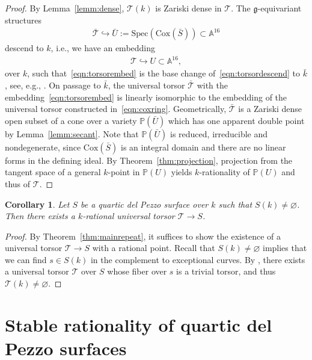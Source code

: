 \documentclass[12pt, reqno]{amsart}
\theoremstyle{plain}
\newtheorem{coro}[prop]{Corollary}
\theoremstyle{remark}
\theoremstyle{definition}
\numberwithin{equation}{section}
\def\cT{{\mathcal T}}
\def\bA{{\mathbb A}}
\def\bP{{\mathbb P}}
\def\Cox{\mathrm{Cox}}
\def\Spec{\mathrm{Spec}}
\begin{document}
\begin{proof}
By Lemma~\ref{lemm:dense}, $\cT(k)$ is Zariski dense in $\cT$.
The $\mathfrak g$-equivariant structures
\begin{align}\label{eqn:torsorembed}
    \bar{\cT}\hookrightarrow \bar{U}:=\Spec(\Cox(\bar{S}))\subset \bA^{16}
\end{align}
descend to $k$, i.e., we have 
an embedding
\begin{align}\label{eqn:torsordescend}
\cT\hookrightarrow U\subset \bA^{16},
\end{align}
over $k$, such that~\eqref{eqn:torsorembed} is the base change of~\eqref{eqn:torsordescend} to $\bar k$, see, e.g., \cite[Remark 4.5]{derenthal-non}.
On passage to $\bar{k}$, the universal torsor $\bar\cT$ with the embedding~\eqref{eqn:torsorembed} is linearly isomorphic to the embedding of the universal torsor constructed in~\eqref{eqn:coxring}. Geometrically, $\bar{\cT}$ is a Zariski dense open subset of a cone over a variety $\bP(\bar{U})$ which 
has one apparent double point by Lemma~\ref{lemm:secant}. Note that $\bP(\bar{U})$ is reduced, irreducible and nondegenerate, since $\Cox(\bar S)$ is an integral domain and there are no linear forms in the defining ideal. 
By Theorem~\ref{thm:projection}, projection from the tangent space of a general $k$-point in $\bP(U)$ yields $k$-rationality of $\bP(U)$ and thus of $\cT$. 
\end{proof}


\begin{coro}\label{coro:rattorsor}
    Let $S$ be a quartic del Pezzo surface over $k$ such that $S(k)\ne \varnothing$. Then there exists a $k$-rational universal torsor $\cT\to S$.
\end{coro}
\begin{proof}
    By Theorem~\ref{thm:mainrepeat}, it suffices to show the existence of a universal torsor $\cT\to S$ with a rational point. Recall that $S(k)\ne \varnothing$ implies that we can find $s\in S(k)$ in the complement to exceptional curves. By \cite[Corollary 2.3.4]{CTSansucDuke}, there exists a universal torsor $\cT$ over $S$ whose fiber over $s$ is a trivial torsor, and thus $\cT(k)\ne \varnothing$.
\end{proof}






\section{Stable rationality of quartic del Pezzo surfaces}
\label{sect:stab-rat}
\end{document}
